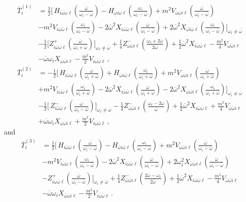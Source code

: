 \documentclass[letterpaper,11pt]{article}
\newcommand{\oi}{\omega_i}
\newcommand{\ol}{\omega_\ell}
\newcommand{\ob}{\overline{\omega}}
\begin{document}
\begin{align}
\overline{T}^{(1)}_{i} &= \frac{1}{2} \bigg[ \, H_{i\ob\ob\ell} \left( \frac{\ob}{\oi - \ob} \right) - H_{\ob i \ob\ell} \left( \frac{\oi}{\oi - \ob} \right) + m^2 V_{\ob\ob i\ell} \left( \frac{\ob}{\oi - \ob} \right) \nonumber \\
%
& - m^2 V_{i \ob\ob\ell} \left( \frac{\oi}{\oi - \ob} \right) - 2 \ob^2 X_{i\ob\ob\ell} \left( \frac{\ob}{\oi - \ob} \right) + 2 \ob^2 X_{\ob i \ob\ell} \left( \frac{\oi}{\oi - \ob} \right) \bigg]_{\oi \neq \ob} \nonumber \\
%
& -\frac{1}{2} \bigg[ Z^+_{i\ob\ob\ell} \left( \frac{\ob}{\ol + \ob} \right) \bigg]_{\ol \neq \ob} \!\! + \frac{1}{4} Z^-_{\ob\ob i \ell} \left( \frac{\ol + 2\ob}{2 \ob} \right) + \frac{1}{2} \ob^2 X_{i\ob\ob\ell} - \frac{m^2}{4} V_{\ob\ob i \ell} \nonumber \\
%
& - \ob \oi X_{\ob\ob i\ell} - \frac{m^2}{2} V_{i \ob\ob\ell} \, ,
\end{align}
\begin{align}
\overline{T}^{(2)}_{i} &=  - \frac{1}{2} \bigg[ \, H_{i\ob\ob \ell} \left( \frac{\ob}{\oi + \ob} \right) + H_{\ob i \ob \ell} \left( \frac{\oi}{\oi + \ob} \right) + m^2 V_{\ob \ob i \ell} \left( \frac{\ob}{\oi + \ob} \right) \nonumber \\
%
& + m^2 V_{i\ob\ob\ell} \left( \frac{\oi}{\oi + \ob} \right) - 2 \ob^2 X_{i \ob\ob\ell} \left( \frac{\ob}{\oi + \ob} \right) - 2 \ob^2 X_{\ob\ob i\ell} \left( \frac{\oi}{\oi + \ob} \right) \bigg]_{\oi \neq \ob} \nonumber \\
%
& - \frac{1}{2} \bigg[ \, Z^{-}_{i \ob \ob \ell} \left( \frac{\ob}{\ol - \ob} \right) \bigg]_{\ol \neq \ob} \!\!\!\! - \frac{1}{4} Z^-_{\ob\ob i \ell} \left( \frac{\ol - 2\ob}{\ob} \right) + \frac{1}{2} \ob^2 X_{i\ob\ob\ell} + \frac{m^2}{4} V_{\ob\ob i\ell} \nonumber \\
%
& + \ob \oi X_{\ob\ob i \ell} + \frac{m^2}{2} V_{i \ob\ob \ell} \, ,
\end{align}
and
\begin{align}
\overline{T}^{(3)}_{i} &= \frac{1}{2} \bigg[ \, H_{i\ob\ob\ell} \left( \frac{\ob}{\oi - \ob} \right) - H_{\ob i \ob\ell} \left( \frac{\oi}{\oi - \ob} \right) + m^2 V_{\ob\ob i \ell} \left( \frac{\ob}{\oi - \ob} \right) \nonumber \\
%
& - m^2 V_{i\ob\ob\ell} \left( \frac{\oi}{\oi - \ob} \right) - 2 \ob^2 X_{i\ob\ob\ell} \left( \frac{\ob}{\oi-\ob} \right) + 2 \oi^2 X_{\ob\ob i\ell} \left( \frac{\ob}{\oi-\ob} \right) \nonumber \\
%
& - Z^+_{i\ob\ob\ell} \left( \frac{\ob}{\oi - \ob} \right) \bigg]_{\oi \neq \ob} + \frac{1}{4} Z^-_{\ob\ob i \ell} \left( \frac{2\ob - \ol}{2\ob} \right) + \frac{1}{2} \ob^2 X_{i\ob\ob\ell} - \frac{m^2}{4} V_{\ob\ob i\ell} \nonumber \\
%
&  - \ob \oi X_{\ob\ob i\ell} - \frac{m^2}{2} V_{i\ob\ob\ell} \, .
\end{align}






\end{document}

